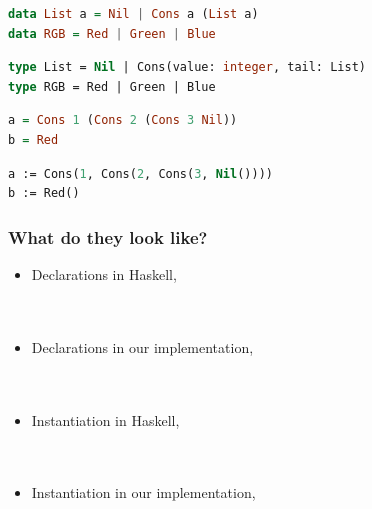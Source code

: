 \documentclass{beamer}
\begin{document}
\begin{lrbox}{\haskellTypes}
\begin{lstlisting}[language=Haskell, basicstyle=\footnotesize]
data List a = Nil | Cons a (List a)
data RGB = Red | Green | Blue
\end{lstlisting}
\end{lrbox}

\begin{lrbox}{\pZeroTypes}
\begin{lstlisting}[language=Pascal, basicstyle=\footnotesize]
type List = Nil | Cons(value: integer, tail: List)
type RGB = Red | Green | Blue
\end{lstlisting}
\end{lrbox}


\begin{lrbox}{\haskellTypesInst}
\begin{lstlisting}[language=Haskell, basicstyle=\footnotesize]
a = Cons 1 (Cons 2 (Cons 3 Nil))
b = Red
\end{lstlisting}
\end{lrbox}

\begin{lrbox}{\pZeroTypesInst}
\begin{lstlisting}[language=Pascal, basicstyle=\footnotesize]
a := Cons(1, Cons(2, Cons(3, Nil())))
b := Red()
\end{lstlisting}
\end{lrbox}

\begin{frame}
\frametitle{What do they look like?}
\begin{itemize}
 \item<1-> Declarations in Haskell,\\
    \usebox{\haskellTypes} \\
    \ \\
 \item<2-> Declarations in our implementation,\\
    \usebox{\pZeroTypes} \\
    \ \\
 \item<3-> Instantiation in Haskell,\\
    \usebox{\haskellTypesInst} \\
    \ \\
 \item<4-> Instantiation in our implementation,\\
    \usebox{\pZeroTypesInst} \\
\end{itemize}

\end{frame}
\end{document}
